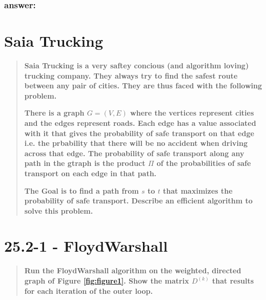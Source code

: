 \documentclass[titlepage]{article}\usepackage[]{graphicx}\usepackage[]{color}
\begin{document}
\subsubsection{answer:}
\vspace{5cm}

\section{Saia Trucking}
\begin{quote}
  \textbf{Saia Trucking is a very saftey concious (and algorithm loving)
  trucking company. They always try to find the safest route between any pair
of cities. They are thus faced with the following problem.}

\textbf{There is a graph $G = (V,E)$ where the vertices represent cities and the edges
represent roads. Each edge has a value associated with it that gives the
probability of safe transport on that edge i.e. the prbability that there will
be no accident when driving across that edge. The probability of safe transport
along any path in the gtraph is the product $\Pi$ of the probabilities of safe
transport on each edge in that path.}

\textbf{The Goal is to find a path from $s$ to $t$ that maximizes the probability of
safe transport. Describe an efficient algorithm to solve this problem.  }
\end{quote}

\newpage
\section{25.2-1 - Floyd\textemdash Warshall}
\begin{quote}
  \textbf{Run the Floyd\textemdash Warshall algorithm on the weighted, directed
	graph of Figure \ref{fig:figure1}. Show the matrix $D^{(k)}$ that results for each
	iteration of the outer loop.}
\end{quote}
\end{document}
